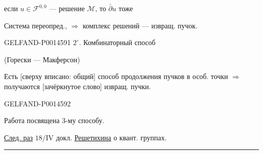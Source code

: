 если \(u\in\mathcal F^{0,0}\) — решение \(\mathcal M\), то \(\bar\partial u\) тоже

Система переопред., \(\Rightarrow\) комплекс решений — извращ. пучок.


\begin{GelfandAdjacentEvidence}{GELFAND-P001459}{1}
\(2^\circ\). Комбинаторный способ

(Горески — Макферсон)

Есть [сверху вписано: общий] способ продолжения пучков в особ. точки \(\Rightarrow\) получаются [зачёркнутое слово] извращ. пучки.
\end{GelfandAdjacentEvidence}
\begin{GelfandAdjacentEvidence}{GELFAND-P001459}{2}


Работа посвящена \(3\)-му способу.

\underline{След. раз} \(18/\mathrm{IV}\) докл. \underline{Решетихина} о квант. группах.

\noindent\rule{.48\linewidth}{.35pt}
\end{GelfandAdjacentEvidence}



